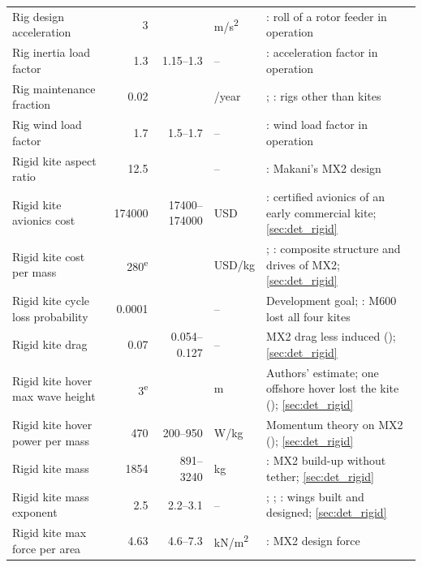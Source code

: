 \begin{longtable}{@{}>{\raggedright\arraybackslash}p{3.4cm}rr>{\raggedright\arraybackslash}p{1.4cm}>{\raggedright\arraybackslash}p{5.8cm}@{}}
Rig design acceleration & \num{3} &  & m/s\textsuperscript{2} & \citet[Table 2-1, p. 10]{marin2025feeder}: roll of a rotor feeder in operation \\
Rig inertia load factor & \num{1.3} & \num{1.15}--\num{1.3} & -- & \citet[Sec 4, Tab 2]{bv2026nr206}: acceleration factor in operation \\
Rig maintenance fraction & \num{0.02} &  & 1/year & \citet[p. 45]{emsa2023}; \citet[p. 15]{tillig2020b}: rigs other than kites \\
Rig wind load factor & \num{1.7} & \num{1.5}--\num{1.7} & -- & \citet[Sec 4, Tab 2]{bv2026nr206}: wind load factor in operation \\
Rigid kite aspect ratio & \num{12.5} &  & -- & \citet[Part I, Table 2]{echeverri2020part1}: Makani's MX2 design \\
Rigid kite avionics cost & \num{174000} & \num{17400}--\num{174000} & USD & \citet[p. 702]{joshi2025}: certified avionics of an early commercial kite; \cref{sec:det_rigid} \\
Rigid kite cost per mass & \num{280}\textsuperscript{e} &  & USD/kg & \citet[p. 702]{joshi2025}; \citet{bauer2018}: composite structure and drives of MX2; \cref{sec:det_rigid} \\
Rigid kite cycle loss probability & \num{0.0001} &  & -- & Development goal; \citet{echeverri2020part1}: M600 lost all four kites \\
Rigid kite drag & \num{0.07} & \num{0.054}--\num{0.127} & -- & MX2 drag less induced (\citealp[Part I, Table 1]{echeverri2020part1}); \cref{sec:det_rigid} \\
Rigid kite hover max wave height & \num{3}\textsuperscript{e} &  & m & Authors' estimate; one offshore hover lost the kite (\citealp{echeverri2020part1}); \cref{sec:det_rigid} \\
Rigid kite hover power per mass & \num{470} & \num{200}--\num{950} & W/kg & Momentum theory on MX2 (\citealp[Part I, Eq. 89]{echeverri2020part1}); \cref{sec:det_rigid} \\
Rigid kite mass & \num{1854} & \num{891}--\num{3240} & kg & \citet[Part II, pp.287-288]{echeverri2020part2}: MX2 build-up without tether; \cref{sec:det_rigid} \\
Rigid kite mass exponent & \num{2.5} & \num{2.2}--\num{3.1} & -- & \citet{sommerfeld2022scaling}; \citet{vanhagen2023}; \citet{noth2008}: wings built and designed; \cref{sec:det_rigid} \\
Rigid kite max force per area & \num{4.63} & \num{4.6}--\num{7.3} & kN/m\textsuperscript{2} & \citet[Part I, Table 1]{echeverri2020part1}: MX2 design force \\

\end{longtable}
